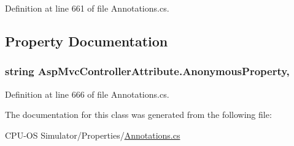 Definition at line 661 of file Annotations.\+cs.



\subsection{Property Documentation}
\hypertarget{class_asp_mvc_controller_attribute_adb49d7099fe6a2366db45aca2e3488ab}{}
\subsubsection[{Anonymous\+Property}]{\setlength{\rightskip}{0pt plus 5cm}string Asp\+Mvc\+Controller\+Attribute.\+Anonymous\+Property\hspace{0.3cm}{\ttfamily [get]}, {}}\label{class_asp_mvc_controller_attribute_adb49d7099fe6a2366db45aca2e3488ab}


Definition at line 666 of file Annotations.\+cs.



The documentation for this class was generated from the following file\+:\begin{DoxyCompactItemize}
\item 
C\+P\+U-\/\+O\+S Simulator/\+Properties/\hyperlink{_annotations_8cs}{Annotations.\+cs}\end{DoxyCompactItemize}
